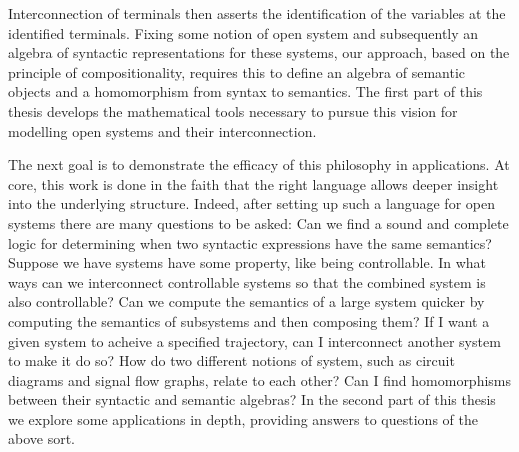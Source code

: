 Interconnection of terminals then asserts the identification of the variables at
the identified terminals. Fixing some notion of open system and subsequently an
algebra of syntactic representations for these systems, our approach, based on
the principle of compositionality, requires this to define an algebra of
semantic objects and a homomorphism from syntax to semantics. The first part of
this thesis develops the mathematical tools necessary to pursue this vision for
modelling open systems and their interconnection. 

The next goal is to demonstrate the efficacy of this philosophy in applications.
At core, this work is done in the faith that the right language allows deeper
insight into the underlying structure. Indeed, after setting up such a language
for open systems there are many questions to be asked: Can we find a sound and
complete logic for determining when two syntactic expressions have the same
semantics? Suppose we have systems have some property, like being controllable.
In what ways can we interconnect controllable systems so that the combined
system is also controllable? Can we compute the semantics of a large system
quicker by computing the semantics of subsystems and then composing them?  If I
want a given system to acheive a specified trajectory, can I interconnect
another system to make it do so? How do two different notions of system, such as
circuit diagrams and signal flow graphs, relate to each other? Can I find
homomorphisms between their syntactic and semantic algebras? In the second part
of this thesis we explore some applications in depth, providing answers to
questions of the above sort.

